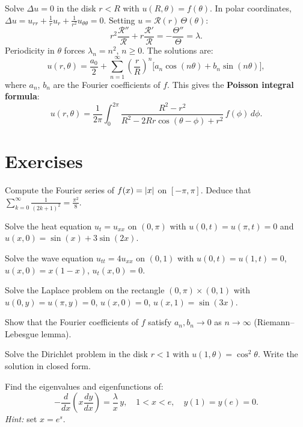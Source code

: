\begin{example}
Solve $\Delta u = 0$ in the disk $r < R$ with $u(R,\theta) = f(\theta)$.
In polar coordinates, $\Delta u = u_{rr} + \frac{1}{r}u_r + \frac{1}{r^2}u_{\theta\theta} = 0$.
Setting $u = \mathcal{R}(r)\, \Theta(\theta)$:
\[
    r^2\frac{\mathcal{R}''}{\mathcal{R}} + r\frac{\mathcal{R}'}{\mathcal{R}}
    = -\frac{\Theta''}{\Theta} = \lambda.
\]
Periodicity in $\theta$ forces $\lambda_n = n^2$, $n \geq 0$. The
solutions are:
\[
    u(r,\theta) = \frac{a_0}{2} + \sum_{n=1}^{\infty}
    \left(\frac{r}{R}\right)^n \bigl[a_n \cos(n\theta) + b_n \sin(n\theta)\bigr],
\]
where $a_n$, $b_n$ are the Fourier coefficients of $f$. This gives the
\textbf{Poisson integral formula}:
\[
    u(r,\theta) = \frac{1}{2\pi}\int_0^{2\pi}
    \frac{R^2 - r^2}{R^2 - 2Rr\cos(\theta-\phi) + r^2}\, f(\phi)\, d\phi.
\]
\end{example}

\section{Exercises}

\begin{exercise}
Compute the Fourier series of $f(x) = \left| x \right|$ on $[-\pi,\pi]$.
Deduce that $\sum_{k=0}^{\infty} \frac{1}{(2k+1)^2} = \frac{\pi^2}{8}$.
\end{exercise}

\begin{exercise}
Solve the heat equation $u_t = u_{xx}$ on $(0,\pi)$ with
$u(0,t) = u(\pi,t) = 0$ and $u(x,0) = \sin(x) + 3\sin(2x)$.
\end{exercise}

\begin{exercise}
Solve the wave equation $u_{tt} = 4u_{xx}$ on $(0,1)$ with
$u(0,t) = u(1,t) = 0$, $u(x,0) = x(1-x)$, $u_t(x,0) = 0$.
\end{exercise}

\begin{exercise}
Solve the Laplace problem on the rectangle $(0,\pi) \times (0,1)$ with
$u(0,y) = u(\pi,y) = 0$, $u(x,0) = 0$, $u(x,1) = \sin(3x)$.
\end{exercise}

\begin{exercise}
Show that the Fourier coefficients of $f$ satisfy
$a_n, b_n \to 0$ as $n \to \infty$ (Riemann--Lebesgue lemma).
\end{exercise}

\begin{exercise}
Solve the Dirichlet problem in the disk $r < 1$ with
$u(1,\theta) = \cos^2\theta$. Write the solution in closed form.
\end{exercise}

\begin{exercise}
Find the eigenvalues and eigenfunctions of:
\[
    -\frac{d}{dx}\left(x\frac{dy}{dx}\right) = \frac{\lambda}{x}\, y,
    \quad 1 < x < e, \quad y(1) = y(e) = 0.
\]
\emph{Hint:} set $x = e^s$.
\end{exercise}
